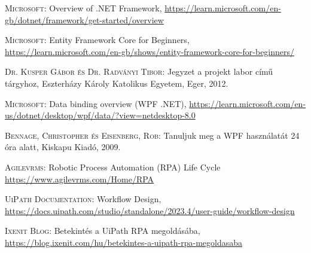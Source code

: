 \documentclass[
]{thesis-ekf}
\theoremstyle{definition}
\theoremstyle{remark}
\begin{document}
\begin{thebibliography}{2}
\textsc{Microsoft}: Overview of .NET Framework, 
\url{https://learn.microsoft.com/en-gb/dotnet/framework/get-started/overview}

\textsc{Microsoft}: Entity Framework Core for Beginners, 
\url{https://learn.microsoft.com/en-gb/shows/entity-framework-core-for-beginners/}

\textsc{Dr. Kusper Gábor és Dr. Radványi Tibor}: Jegyzet a projekt labor című tárgyhoz, Eszterházy Károly Katolikus Egyetem, Eger, 2012.

\textsc{Microsoft}: Data binding overview (WPF .NET), 
\url{https://learn.microsoft.com/en-us/dotnet/desktop/wpf/data/?view=netdesktop-8.0}

\textsc{Bennage, Christopher és Eisenberg, Rob}: Tanuljuk meg a WPF használatát 24 óra alatt, Kiskapu Kiadó, 2009.

\textsc{Agilevrms}: Robotic Process Automation (RPA) Life Cycle
\url{https://www.agilevrms.com/Home/RPA}

\textsc{UiPath Documentation}: Workflow Design, 
\url{https://docs.uipath.com/studio/standalone/2023.4/user-guide/workflow-design}

\textsc{Ixenit Blog}: Betekintés a UiPath RPA megoldásába, 
\url{https://blog.ixenit.com/hu/betekintes-a-uipath-rpa-megoldasaba}
\end{thebibliography}


\end{document}
